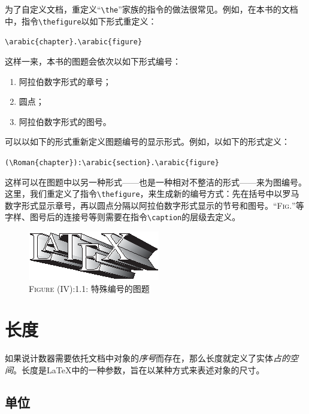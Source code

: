 为了自定义文档，重定义``\verb|\the|''家族的指令的做法很常见。例如，在本书的文档中，指令\verb|\thefigure|以如下形式重定义：

\begin{dmd}
\verb|\arabic{chapter}.\arabic{figure}|
\end{dmd}

这样一来，本书的图题会依次以如下形式编号：

\begin{enumerate}
  \item 阿拉伯数字形式的章号；
  \item 圆点；
  \item 阿拉伯数字形式的图号。
\end{enumerate}

可以以如下的形式重新定义图题编号的显示形式。例如，以如下的形式定义：

\begin{dmd}
\verb|(\Roman{chapter}):\arabic{section}.\arabic{figure}|
\end{dmd}

这样可以在图题中以另一种形式——也是一种相对不整洁的形式——来为图编号。这里，我们重定义了指令\verb|\thefigure|，来生成新的编号方式：先在括号中以罗马数字形式显示章号，再以圆点分隔以阿拉伯数字形式显示的节号和图号。``\textsc{Fig.}''等字样、图号后的连接号等则需要在指令\verb|\caption|的层级去定义。

\begin{figure}[ht]
  \centering
  \includegraphics{img/latex.eps}\\
  \textsc{Figure} (IV):1.1: 特殊编号的图题
\end{figure}

\section{长度}

如果说计数器需要依托文档中对象的\emph{序号}而存在，那么长度就定义了实体\emph{占的空间}。长度是\LaTeX 中的一种参数，旨在以某种方式来表述对象的尺寸。

\subsection{单位}

